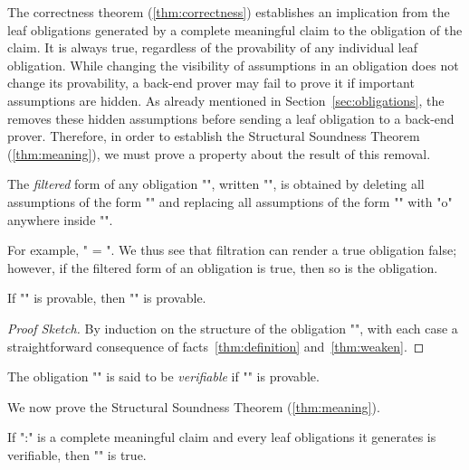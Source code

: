 \documentclass[a4paper]{easychair}
\begin{document}
The correctness theorem (\ref{thm:correctness}) establishes an
implication from the leaf obligations generated by a complete
meaningful claim to the obligation of the claim. It is always true,
regardless of the provability of any individual leaf obligation. While
changing the visibility of assumptions in an obligation does not
change its provability, a back-end prover may fail to prove it if
important assumptions are hidden.  As already mentioned in
Section~\ref{sec:obligations}, the \PM removes these hidden
assumptions before sending a leaf obligation to a back-end prover.
Therefore, in order to establish the Structural Soundness Theorem
(\ref{thm:meaning}), we must prove a property about the result of this
removal.

\begin{defn}[Filtration] \label{defn:filter} 
The \emph{filtered} form of any obligation "\phi", written
  "\filter\phi", is obtained by deleting all assumptions of the form
  "" and replacing all assumptions of the form "" with "\NEW o" anywhere inside "\phi".
\end{defn}

\noindent For example, " = ". We thus see that filtration can render a true
obligation false; however, if the filtered form of an obligation is
true, then so is the obligation.

\begin{lem} \label{thm:verification}
If "\filter{\phi}" is provable, then "\phi" is provable.
\end{lem}

\begin{proof}[Proof Sketch]
  By induction on the structure of the obligation "\phi", with each
  case a straightforward consequence of facts~\ref{thm:definition}
  and~\ref{thm:weaken}.
\end{proof}

\begin{defn}[Verifiability] \label{defn:verifiability}
The obligation "\phi" is said to be  \emph{verifiable} if "\filter\phi" is
  provable.
\end{defn}

\noindent We now prove the Structural Soundness Theorem (\ref{thm:meaning}).

\setcounter{thm}{0}

\begin{thm}
If "\pi:\phi" is a complete meaningful claim and every leaf
  obligations it generates is verifiable, then "\phi" is true.
\end{thm}
\end{document}
